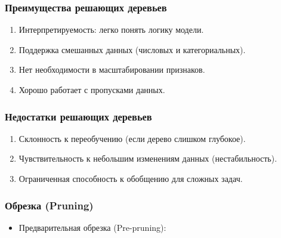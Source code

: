 \begin{enumerate}
\hypertarget{ux43fux440ux435ux438ux43cux443ux449ux435ux441ux442ux432ux430-ux440ux435ux448ux430ux44eux449ux438ux445-ux434ux435ux440ux435ux432ux44cux435ux432}{%
\subsubsection*{Преимущества решающих
деревьев}\label{ux43fux440ux435ux438ux43cux443ux449ux435ux441ux442ux432ux430-ux440ux435ux448ux430ux44eux449ux438ux445-ux434ux435ux440ux435ux432ux44cux435ux432}}

\begin{enumerate}
\def\labelenumi{\arabic{enumi}.}
\tightlist
\item
  Интерпретируемость: легко понять логику модели.
\item
  Поддержка смешанных данных (числовых и категориальных).
\item
  Нет необходимости в масштабировании признаков.
\item
  Хорошо работает с пропусками данных.
\end{enumerate}

\hypertarget{ux43dux435ux434ux43eux441ux442ux430ux442ux43aux438-ux440ux435ux448ux430ux44eux449ux438ux445-ux434ux435ux440ux435ux432ux44cux435ux432}{%
\subsubsection*{Недостатки решающих
деревьев}\label{ux43dux435ux434ux43eux441ux442ux430ux442ux43aux438-ux440ux435ux448ux430ux44eux449ux438ux445-ux434ux435ux440ux435ux432ux44cux435ux432}}

\begin{enumerate}
\def\labelenumi{\arabic{enumi}.}
\tightlist
\item
  Склонность к переобучению (если дерево слишком глубокое).
\item
  Чувствительность к небольшим изменениям данных (нестабильность).
\item
  Ограниченная способность к обобщению для сложных задач.
\end{enumerate}

\hypertarget{ux43eux431ux440ux435ux437ux43aux430-pruning}{%
\subsubsection*{Обрезка
(Pruning)}\label{ux43eux431ux440ux435ux437ux43aux430-pruning}}

\begin{itemize}
\tightlist
\item
  Предварительная обрезка (Pre-pruning):


\end{itemize}
\end{enumerate}
